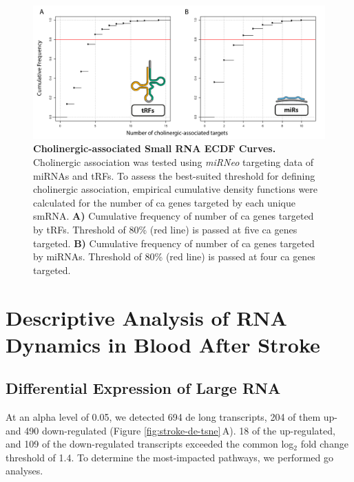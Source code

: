 \begin{figure}
\includegraphics[width=\textwidth]{figures/cholino-ecdfs}
\caption[Cholinergic-associated Small RNA ECDF Curves.]{\textbf{Cholinergic-associated Small RNA ECDF Curves.} Cholinergic association was tested using \emph{miRNeo} targeting data of miRNAs and tRFs. To assess the best-suited threshold for defining cholinergic association, empirical cumulative density functions were calculated for the number of \acf{ca} genes targeted by each unique smRNA. \textbf{A)} Cumulative frequency of number of \ac{ca} genes targeted by tRFs. Threshold of 80\% (red line) is passed at five \ac{ca} genes targeted. \textbf{B)} Cumulative frequency of number of \ac{ca} genes targeted by miRNAs. Threshold of 80\% (red line) is passed at four \ac{ca} genes targeted.
\label{fig:cholino-ecdfs}}
\end{figure}

\section{Descriptive Analysis of RNA Dynamics in Blood After Stroke}

\subsection{Differential Expression of Large RNA}
At an alpha level of 0.05, we detected 694 \acf{de} long transcripts, 204 of them up- and 490 down-regulated (Figure \ref{fig:stroke-de-tsne}\,A). 18 of the up-regulated, and 109 of the down-regulated transcripts exceeded the common log$_2$ fold change threshold of 1.4. To determine the most-impacted pathways, we performed \ac{go} analyses.

